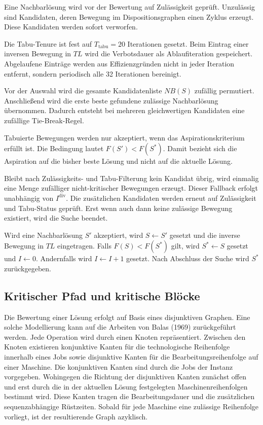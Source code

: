 Eine Nachbarlösung wird vor der Bewertung auf Zulässigkeit geprüft.
Unzulässig sind Kandidaten, deren Bewegung im Dispositionsgraphen einen Zyklus erzeugt.
Diese Kandidaten werden sofort verworfen.

Die Tabu-Tenure ist fest auf $T_{\text{tabu}} = 20$ Iterationen gesetzt.
Beim Eintrag einer inversen Bewegung in $TL$ wird die Verbotsdauer als Ablaufiteration gespeichert.
Abgelaufene Einträge werden aus Effizienzgründen nicht in jeder Iteration entfernt, sondern periodisch alle 32 Iterationen bereinigt.

Vor der Auswahl wird die gesamte Kandidatenliste $NB(S)$ zufällig permutiert.
Anschließend wird die erste beste gefundene zulässige Nachbarlösung übernommen.
Dadurch entsteht bei mehreren gleichwertigen Kandidaten eine zufällige Tie-Break-Regel.

Tabuierte Bewegungen werden nur akzeptiert, wenn das Aspirationskriterium erfüllt ist.
Die Bedingung lautet $F(S') < F(S^\ast)$.
Damit bezieht sich die Aspiration auf die bisher beste Lösung und nicht auf die aktuelle Lösung.

Bleibt nach Zulässigkeits- und Tabu-Filterung kein Kandidat übrig, wird einmalig eine Menge zufälliger nicht-kritischer Bewegungen erzeugt.
Dieser Fallback erfolgt unabhängig von $I^{\text{div}}$.
Die zusätzlichen Kandidaten werden erneut auf Zulässigkeit und Tabu-Status geprüft.
Erst wenn auch dann keine zulässige Bewegung existiert, wird die Suche beendet.

Wird eine Nachbarlösung $S'$ akzeptiert, wird $S \gets S'$ gesetzt und die inverse Bewegung in $TL$ eingetragen.
Falls $F(S) < F(S^\ast)$ gilt, wird $S^\ast \gets S$ gesetzt und $I \gets 0$.
Andernfalls wird $I \gets I + 1$ gesetzt.
Nach Abschluss der Suche wird $S^\ast$ zurückgegeben.


\subsection{Kritischer Pfad und kritische Blöcke}
\label{sec:kritischer-pfad}
Die Bewertung einer Lösung erfolgt auf Basis eines disjunktiven Graphen. Eine solche Modellierung kann auf die Arbeiten von Balas (1969) \cite{balas_machine_1969} zurückgeführt werden.
Jede Operation wird durch einen Knoten repräsentiert.
Zwischen den Knoten existieren konjunktive Kanten für die technologische Reihenfolge innerhalb eines Jobs sowie disjunktive Kanten für die Bearbeitungsreihenfolge auf einer Maschine.
Die konjunktiven Kanten sind durch die Jobs der Instanz vorgegeben.
Wohingegen die Richtung der disjunktiven Kanten zunächst offen und erst durch die in der aktuellen Lösung festgelegten Maschinenreihenfolgen bestimmt wird.
Diese Kanten tragen die Bearbeitungsdauer und die zusätzlichen sequenzabhängige Rüstzeiten.
Sobald für jede Maschine eine zulässige Reihenfolge vorliegt, ist der resultierende Graph azyklisch.

